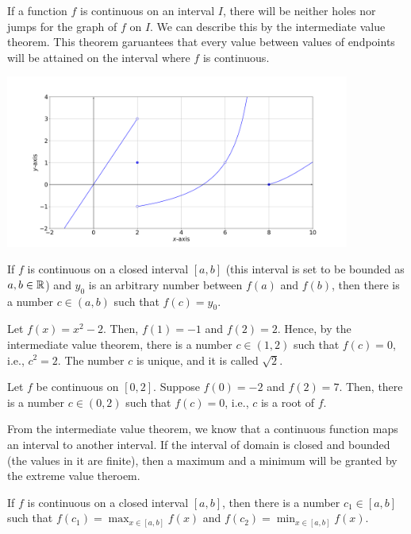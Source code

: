 \documentclass[11pt]{book}
\begin{document}
If a function $f$ is continuous on an interval $I$, there will be neither holes nor jumps for the graph of $f$ on $I$. We can describe this by the intermediate value theorem. This theorem garuantees that every value between values of endpoints will be attained on the interval where $f$ is continuous.

\begin{center}
    \includegraphics[width=0.85\textwidth]{discontinuity.png}
\end{center}

\begin{theorem}
    If $f$ is continuous on a closed interval $[a, b]$ (this interval is set to be bounded as $a, b\in\mathbb{R}$) and $y_0$ is an arbitrary number between $f(a)$ and $f(b)$, then there is a number $c\in(a, b)$ such that $f(c)=y_0$.
\end{theorem}

\begin{example}
    Let $f(x)=x^2-2$. Then, $f(1)=-1$ and $f(2)=2$. Hence, by the intermediate value theorem, there is a number $c\in(1, 2)$ such that $f(c)=0$, i.e., $c^2=2$. The number $c$ is unique, and it is called $\sqrt{2}$.
\end{example}

\begin{example}
    Let $f$ be continuous on $[0, 2]$. Suppose $f(0)=-2$ and $f(2)=7$. Then, there is a number $c\in(0, 2)$ such that $f(c)=0$, i.e., $c$ is a root of $f$.
\end{example}

From the intermediate value theorem, we know that a continuous function maps an interval to another interval. If the interval of domain is closed and bounded (the values in it are finite), then a maximum and a minimum will be granted by the extreme value theroem.

\begin{theorem}
    If $f$ is continuous on a closed interval $[a, b]$, then there is a number $c_1\in[a, b]$ such that $\displaystyle f(c_1)=\max_{x\in[a, b]}f(x)$ and $\displaystyle f(c_2)=\min_{x\in[a, b]}f(x)$.
\end{theorem}
\end{document}
